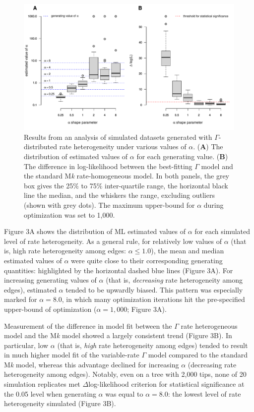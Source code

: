 \documentclass[fleqn,10pt,lineno]{wlpeerj} %
\begin{document}
\begin{figure}
\includegraphics[width=1\linewidth]{Revell-and-Harmon.fitgammaMk.PeerJ_files/figure-latex/Revell-and-Harmon-fig3-1} \caption{Results from an analysis of simulated datasets generated with $\Gamma$-distributed rate heterogeneity under various values of $\alpha$. (\textbf{A}) The distribution of estimated values of $\alpha$ for each generating value. (\textbf{B}) The difference in log-likelihood between the best-fitting $\Gamma$ model and the standard M\emph{k} rate-homogeneous model. In both panels, the grey box gives the 25\% to 75\% inter-quartile range, the horizontal black line the median, and the whiskers the range, excluding outliers (shown with grey dots). The maximum upper-bound for $\alpha$ during optimization was set to 1,000.}\label{fig:Revell-and-Harmon-fig3}
\end{figure}

Figure 3A shows the distribution of ML estimated values of \(\alpha\) for each simulated level of rate heterogeneity. As a general rule, for relatively low values of \(\alpha\) (that is, high rate heterogeneity among edges: \(\alpha \le 1.0\)), the mean and median estimated values of \(\alpha\) were quite close to their corresponding generating quantities: highlighted by the horizontal dashed blue lines (Figure 3A). For increasing generating values of \(\alpha\) (that is, \emph{decreasing} rate heterogeneity among edges), estimated \(\alpha\) tended to be upwardly biased. This pattern was especially marked for \(\alpha = 8.0\), in which many optimization iterations hit the pre-specified upper-bound of optimization (\(\alpha = 1,000\); Figure 3A).

Measurement of the difference in model fit between the \(\Gamma\) rate heterogeneous model and the M\emph{k} model showed a largely consistent trend (Figure 3B). In particular, low \(\alpha\) (that is, \emph{high} rate heterogeneity among edges) tended to result in much higher model fit of the variable-rate \(\Gamma\) model compared to the standard M\emph{k} model, whereas this advantage declined for increasing \(\alpha\) (decreasing rate heterogeneity among edges). Notably, even on a tree with 2,000 tips, none of 20 simulation replicates met \(\Delta\)log-likelihood criterion for statistical significance at the 0.05 level when generating \(\alpha\) was equal to \(\alpha = 8.0\): the lowest level of rate heterogeneity simulated (Figure 3B).
\end{document}
